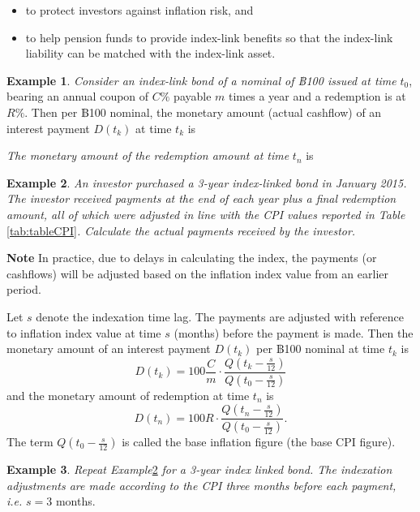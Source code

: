 \documentclass[
]{book}
\theoremstyle{definition}
\theoremstyle{definition}
\newtheorem{example}{Example}[chapter]
\theoremstyle{definition}
\theoremstyle{definition}
\theoremstyle{remark}
\begin{document}
\begin{itemize}
\item
  to protect investors against inflation risk, and
\item
  to help pension funds to provide index-link benefits so that the
  index-link liability can be matched with the index-link asset.
\end{itemize}

\begin{example}
\emph{Consider an index-link bond of a nominal of ฿100 issued at time} \(t_0\),
bearing an annual coupon of \(C\%\) payable \(m\) times a year and a
redemption is at \(R\%\). Then per ฿100 nominal, the monetary amount
(actual cashflow) of an interest payment \(D(t_k)\) at time \(t_k\) is

\emph{The monetary amount of the redemption amount at time} \(t_n\) is
\end{example}

\begin{example}
\protect\hypertarget{exm:exampleILB}{}\label{exm:exampleILB}\emph{An investor purchased a 3-year index-linked bond in January 2015. The
investor received payments at the end of each year plus a final
redemption amount, all of which were adjusted in line with the CPI
values reported in Table} \ref{tab:tableCPI}\emph{. Calculate the actual
payments received by the investor.}
\end{example}

\textbf{Note} In practice, due to delays in calculating the index, the
payments (or cashflows) will be adjusted based on the inflation index
value from an earlier period.

Let \(s\) denote the indexation time lag. The payments are adjusted with
reference to inflation index value at time \(s\) (months) before the
payment is made. Then the monetary amount of an interest payment
\(D(t_k)\) per ฿100 nominal at time \(t_k\) is
\[\displaystyle D(t_k) = 100 \frac{C}{m} \cdot \frac{Q(t_k - \frac{s}{12})}{Q(t_0 - \frac{s}{12})}\]
and the monetary amount of redemption at time \(t_n\) is
\[D(t_n) = 100 R \cdot \frac{Q(t_n - \frac{s}{12})}{Q(t_0 - \frac{s}{12})}.\]
The term \(Q(t_0 - \frac{s}{12})\) is called the base inflation figure
(the base CPI figure).

\begin{example}
\emph{Repeat Example}\ref{exm:exampleILB} \emph{for a 3-year index linked bond.
The indexation adjustments are made according to the CPI three months
before each payment, i.e.} \(s = 3\) months.
\end{example}
\end{document}

